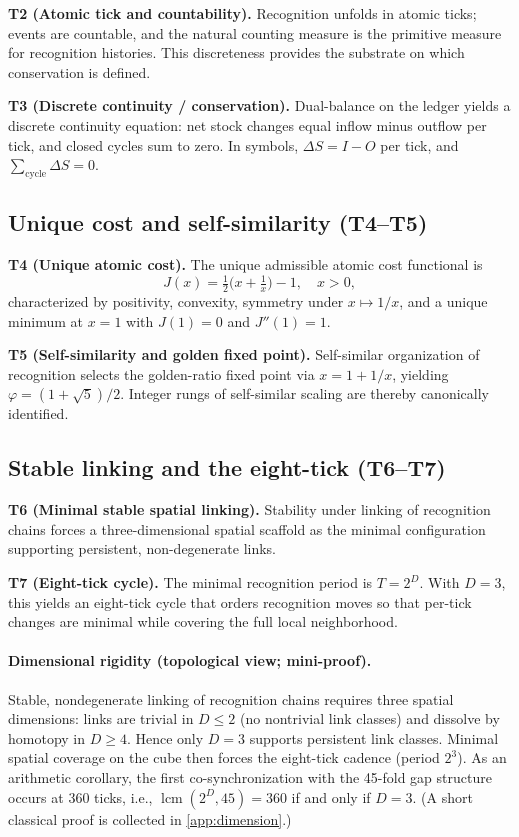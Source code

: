\documentclass[11pt]{article}
\begin{document}
\textbf{T2 (Atomic tick and countability).} Recognition unfolds in atomic ticks; events are countable, and the natural counting measure is the primitive measure for recognition histories. This discreteness provides the substrate on which conservation is defined.

\textbf{T3 (Discrete continuity / conservation).} Dual\mbox{-}balance on the ledger yields a discrete continuity equation: net stock changes equal inflow minus outflow per tick, and closed cycles sum to zero. In symbols, \(\Delta S=I-O\) per tick, and \(\sum_{\text{cycle}}\Delta S=0\).

\subsection{Unique cost and self\mbox{-}similarity (T4--T5)}
\textbf{T4 (Unique atomic cost).} The unique admissible atomic cost functional is
\[ J(x)=\tfrac{1}{2}\bigl(x+\tfrac{1}{x}\bigr)-1, \quad x>0, \]
characterized by positivity, convexity, symmetry under \(x\mapsto 1/x\), and a unique minimum at \(x=1\) with \(J(1)=0\) and \(J''(1)=1\).

\textbf{T5 (Self\mbox{-}similarity and golden fixed point).} Self\mbox{-}similar organization of recognition selects the golden\mbox{-}ratio fixed point via \(x=1+1/x\), yielding \(\varphi=(1+\sqrt{5})/2\). Integer rungs of self\mbox{-}similar scaling are thereby canonically identified.

\subsection{Stable linking and the eight\mbox{-}tick (T6--T7)}
\textbf{T6 (Minimal stable spatial linking).} Stability under linking of recognition chains forces a three\mbox{-}dimensional spatial scaffold as the minimal configuration supporting persistent, non\mbox{-}degenerate links.

\textbf{T7 (Eight\mbox{-}tick cycle).} The minimal recognition period is \(T=2^D\). With \(D=3\), this yields an eight\mbox{-}tick cycle that orders recognition moves so that per\mbox{-}tick changes are minimal while covering the full local neighborhood.

\paragraph{Dimensional rigidity (topological view; mini\mbox{-}proof).} Stable, nondegenerate linking of recognition chains requires three spatial dimensions: links are trivial in \(D\le 2\) (no nontrivial link classes) and dissolve by homotopy in \(D\ge 4\). Hence only \(D=3\) supports persistent link classes. Minimal spatial coverage on the cube then forces the eight\mbox{-}tick cadence (period \(2^3\)). As an arithmetic corollary, the first co\mbox{-}synchronization with the 45\mbox{-}fold gap structure occurs at 360 ticks, i.e., \(\operatorname{lcm}(2^D,45)=360\) if and only if \(D=3\). (A short classical proof is collected in \cref{app:dimension}.)
\end{document}
